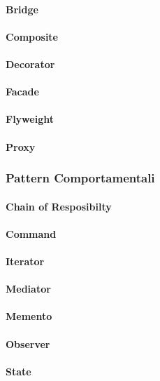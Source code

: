 \documentclass{article}
\begin{document}
            \paragraph{Bridge}
            \paragraph{Composite}
            \paragraph{Decorator}
            \paragraph{Facade}
            \paragraph{Flyweight}
            \paragraph{Proxy}
        \subsubsection{Pattern Comportamentali}
            \paragraph{Chain of Resposibilty}
            \paragraph{Command}
            \paragraph{Iterator}
            \paragraph{Mediator}
            \paragraph{Memento}
            \paragraph{Observer}
            \paragraph{State}
\end{document}
